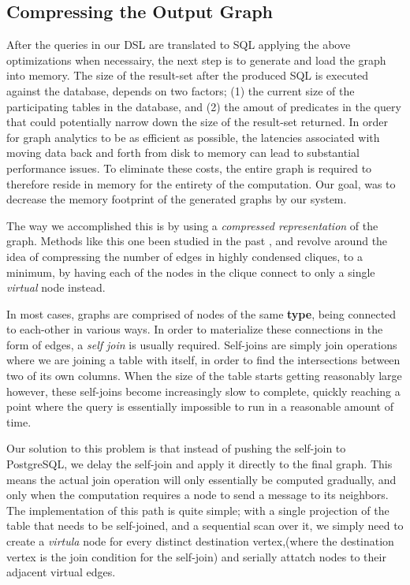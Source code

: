 \documentclass[11pt,letterpaper]{article}
\begin{document}
\subsection*{Compressing the Output Graph}

After the queries in our DSL are translated to SQL applying the above optimizations when necessairy, the next step is to generate and load the graph into memory. The size of the result-set after the produced SQL is executed against the database, depends on two factors; (1) the current size of the participating tables in the database, and (2) the amout of predicates in the query that could potentially narrow down the size of the result-set returned. In order for graph analytics to be as efficient as possible, the latencies associated with moving data back and forth from disk to memory can lead to substantial performance issues. To eliminate these costs, the entire graph is required to therefore reside in memory for the entirety of the computation. Our goal, was to decrease the memory footprint of the generated graphs by our system.

The way we accomplished this is by using a \textit{compressed representation} of the graph. Methods like this one been studied in the past \cite{feder}, and revolve around the idea of compressing the number of edges in highly condensed cliques, to a minimum, by having each of the nodes in the clique connect to only a single \textit{virtual} node instead.

In most cases, graphs are comprised of nodes of the same \textbf{type}, being connected to each-other in various ways. In order to materialize these connections in the form of edges, a \textit{self join} is usually required. Self-joins are simply join operations where we are joining a table with itself, in order to find the intersections between two of its own columns. When the size of the table starts getting reasonably large however, these self-joins become increasingly slow to complete, quickly reaching a point where the query is essentially impossible to run in a reasonable amount of time.

Our solution to this problem is that instead of pushing the self-join to PostgreSQL, we delay the self-join and apply it directly to the final graph. This means the actual join operation will only essentially be computed gradually, and only when the computation requires a node to send a message to its neighbors. The implementation of this path is quite simple; with a single projection of the table that needs to be self-joined, and a sequential scan over it, we simply need to create a \textit{virtula} node for every distinct destination vertex,(where the destination vertex is the join condition for the self-join) and serially attatch nodes to their adjacent virtual edges.
\end{document}
